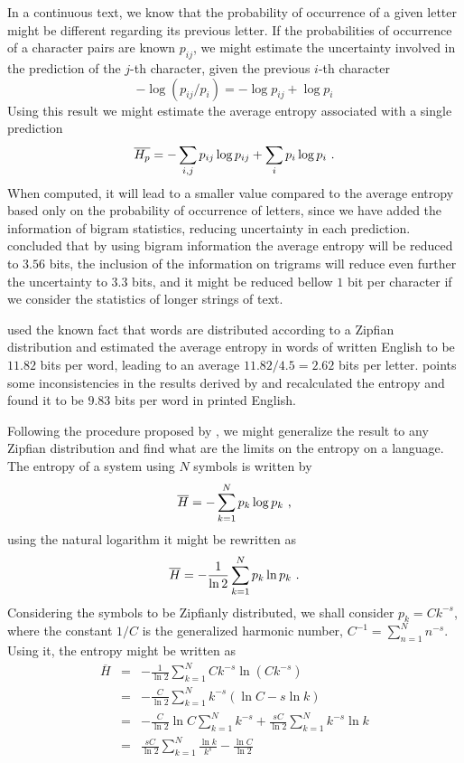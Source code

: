 In a continuous text, we know that the probability of occurrence of a given letter
might be different regarding its previous letter. If the probabilities of occurrence
of a character pairs are known $p_{ij}$, we might estimate the uncertainty involved
in the prediction of the $j$-th character, given the previous $i$-th character
\begin{equation}
- \log (p_{ij} / p_i) = -\log p_{ij} + \log p_i
\end{equation}
Using this result we might estimate the average entropy associated with a single
prediction
\begin{equation}
\overline{H_p} = - \sum_{i,j} p_{ij} \log p_{ij} + \sum_i p_i \log p_i \textmd{ .}
\end{equation}
When computed, it will lead to a smaller value compared to the average entropy 
based only on the probability of occurrence of letters, since we have added
the information of bigram statistics, reducing uncertainty in each prediction.
\cite{shannon1951} concluded that by using bigram information the average 
entropy will be reduced to $3.56$ bits, the inclusion of the information
on trigrams will reduce even further the uncertainty to $3.3$ bits,
and it might be reduced bellow  $1$ bit per character if we consider the
statistics of longer strings of text.

\cite{shannon1951} used the known fact that words are distributed according to 
a Zipfian distribution and estimated the average entropy in words of written English
to be $11.82$ bits per word, leading to an average $11.82/4.5=2.62$ bits per letter.
\cite{grignetti} points some inconsistencies in the results derived by \cite{shannon1951}
and recalculated the entropy and found it to be $9.83$ bits per word in printed English.

Following the procedure proposed by \cite{grignetti}, we might generalize the result to
any Zipfian distribution and find what are the limits on the entropy on a language.
The entropy of a system using $N$ symbols is written by
\begin{equation}
\overline{H} = - \sum_{k=1}^N p_{k} \log p_{k} \textmd{ ,}
\end{equation}
using the natural logarithm it might be rewritten as
\begin{equation}
\overline{H} = -\frac{1}{\ln 2} \sum_{k=1}^N p_{k} \ln p_{k} \textmd{ .}
\end{equation}
Considering the symbols to be Zipfianly distributed, we shall consider $p_k=Ck^{-s}$,
where the constant $1/C$ is the generalized harmonic number, $C^{-1}=\sum_{n=1}^N n^{-s}$.
Using it, the entropy might be written as
\begin{eqnarray}
\label{eq:ent_zipfian_source}
\overline{H} &=& -\frac{1}{\ln 2} \sum_{k=1}^N Ck^{-s} \ln (Ck^{-s}) \nonumber \\
             &=& -\frac{C}{\ln 2} \sum_{k=1}^N k^{-s} (\ln C - s\ln k) \nonumber \\
             &=& -\frac{C}{\ln 2} \ln C \sum_{k=1}^N k^{-s} + \frac{sC}{\ln 2} \sum_{k=1}^N k^{-s} \ln k \nonumber \\
             &=& \frac{sC}{\ln 2} \sum_{k=1}^N \frac{\ln k}{k^s} - \frac{\ln C}{\ln 2}
\end{eqnarray} 

